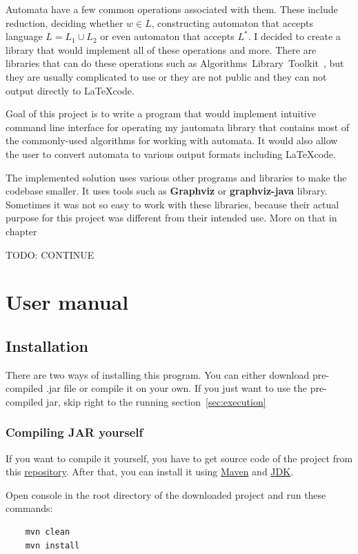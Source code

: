 \documentclass{ctuthesis}
\begin{document}
Automata have a few common operations associated with them. These include reduction, deciding whether $w \in L$, constructing automaton that accepts language $L = L_1 \cup L_2$ or even automaton that accepts $L^*$. I decided to create a library that would implement all of these operations and more. There are libraries that can do these operations such as Algorithms~Library~Toolkit~\cite{alg_lib_toolkit}, but they are usually complicated to use or they are not public and they can not output directly to \LaTeX code. 

Goal of this project is to write a program that would implement intuitive command line interface for operating my jautomata library that contains most of the commonly-used algorithms for working with automata. It would also allow the user to convert automata to various output formats including \LaTeX code.

The implemented solution uses various other programs and libraries to make the codebase smaller. It uses tools such as \textbf{Graphviz} %
or \textbf{graphviz-java} %
library. Sometimes it was not so easy to work with these libraries, because their actual purpose for this project was different from their intended use. More on that in chapter %

TODO: CONTINUE

\chapter{User manual}
\section{Installation}
There are two ways of installing this program. You can either download pre-compiled .jar file or compile it on your own. If you just want to use the pre-compiled jar, skip right to the running section~\ref{sec:execution}

\subsection{Compiling JAR yourself}
If you want to compile it yourself, you have to get source code of the project from this \href{https://github.com/horovtom/jautomata}{repository}. After that, you can install it using \href{https://maven.apache.org/}{Maven} and \href{https://www.oracle.com/technetwork/java/javase/downloads/jdk8-downloads-2133151.html}{JDK}. %

Open console in the root directory of the downloaded project and run these commands:
\begin{verbatim}
	mvn clean
	mvn install
\end{verbatim}
\end{document}
